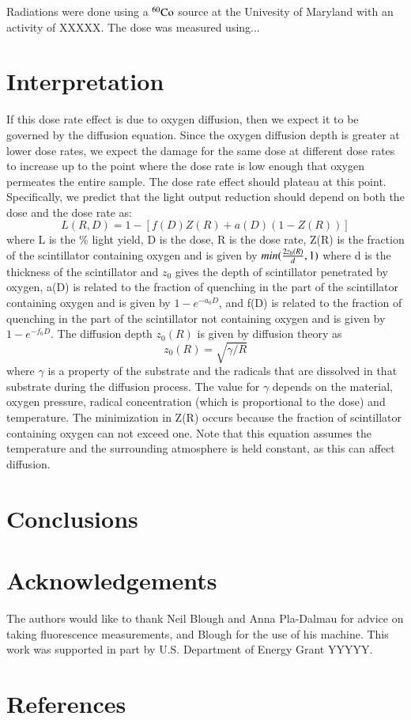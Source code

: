 \documentclass[review]{elsarticle}
\begin{document}
Radiations were done using a ${\rm ^{60}Co}$ source at the Univesity of Maryland with an activity of XXXXX.
The dose was measured using...


\section{Interpretation}


If this dose rate effect is due to oxygen diffusion, then
we expect it to be governed by the diffusion equation.  Since
the oxygen diffusion depth is greater at lower dose rates,
we expect the damage for the same dose at different dose rates to
increase up to the point where the dose rate is low enough that oxygen
permeates the entire sample.  The dose rate effect should plateau
at this point.  Specifically, we predict that the light output
reduction should depend on both the dose and the dose rate as:
$$ L(R,D) = 1 - [f(D)Z(R) + a(D)(1-Z(R))]$$
where L is the \% light yield, D is the dose, R is the dose rate, 
Z(R) is the fraction of the scintillator containing 
oxygen and is given by $min({{2 z_0(R)}\over{d}},1)$
where d is the thickness of the scintillator and $z_0$ gives
the depth of scintillator penetrated by oxygen,
a(D) is related to the fraction of quenching in the part of
the scintillator containing oxygen and is given by $1-e^{-a_0 D}$, 
and
f(D) is related to the fraction of quenching in the part of
the scintillator not containing oxygen and is given by $1-e^{-f_0 D}$.
The diffusion depth $z_0(R)$ is given by diffusion theory as 
$$z_0(R)=\sqrt{\gamma/R}$$
where $\gamma$ is a property of the substrate and the radicals that
are dissolved in that substrate during the diffusion process.
The value for $\gamma$ depends on the material, oxygen pressure,
radical concentration (which is proportional to the dose) and 
temperature.
The minimization in Z(R) occurs because the fraction of scintillator
containing oxygen can not exceed one.  Note that this equation 
assumes the temperature and the surrounding atmosphere
is held constant, as this can 
affect diffusion.


\section{Conclusions}

\section{Acknowledgements}
The authors would like to thank Neil Blough and Anna Pla-Dalmau for advice on taking fluorescence measurements, and Blough for the use of his machine.  This work was supported in part by U.S. Department of Energy Grant YYYYY.

\section*{References}


\end{document}
